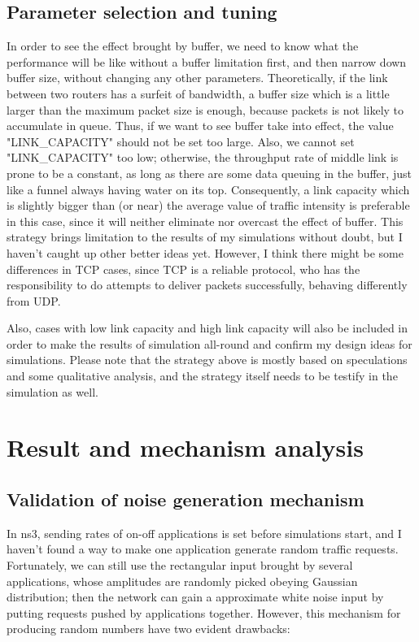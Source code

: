 \documentclass[a4paper]{article}
\begin{document}
\subsection{Parameter selection and tuning}
In order to see the effect brought by buffer, we need to know what the performance will be like without a buffer limitation first, and then narrow down buffer size, without changing any other parameters. Theoretically, if the link between two routers has a surfeit of bandwidth, a buffer size which is a little larger than the maximum packet size is enough, because packets is not likely to accumulate in queue. Thus, if we want to see buffer take into effect, the value "LINK\_CAPACITY" should not be set too large. Also, we cannot set "LINK\_CAPACITY" too low; otherwise, the throughput rate of middle link is prone to be a constant, as long as there are some data queuing in the buffer, just like a funnel always having water on its top. Consequently, a link capacity which is slightly bigger than (or near) the average value of traffic intensity is preferable in this case, since it will neither eliminate nor overcast the effect of buffer. This strategy brings limitation to the results of my simulations without doubt, but I haven't caught up other better ideas yet. However, I think there might be some differences in TCP cases, since TCP is a reliable protocol, who has the responsibility to do attempts to deliver packets successfully, behaving differently from UDP.
	
Also, cases with low link capacity and high link capacity will also be included in order to make the results of simulation all-round and confirm my design ideas for simulations. Please note that the strategy above is mostly based on speculations and some qualitative analysis, and the strategy itself needs to be testify in the simulation as well.


\section{Result and mechanism analysis}
\subsection{Validation of noise generation mechanism}
In ns3, sending rates of on-off applications is set before simulations start, and I haven't found a way to make one application generate random traffic requests. Fortunately, we can still use the rectangular input brought by several applications, whose amplitudes are randomly picked obeying Gaussian distribution; then the network can gain a approximate white noise input by putting requests pushed by applications together. However, this mechanism for producing random numbers have two evident drawbacks:
\end{document}
